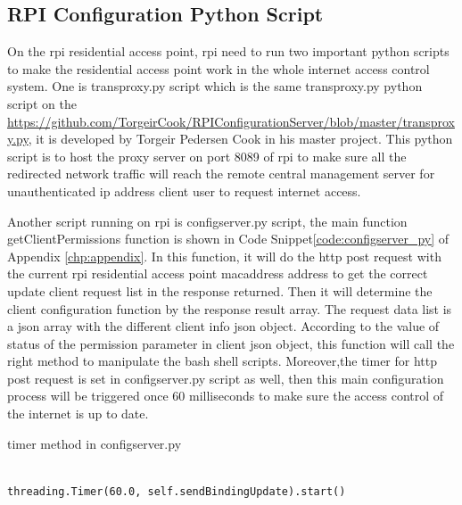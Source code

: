 \subsection{RPI Configuration Python Script}
\par On the \gls{rpi} residential access point, \gls{rpi} need to run two important python scripts to make the residential access point work in the whole internet access control system. One is transproxy.py script which is the same transproxy.py python script on the \url{https://github.com/TorgeirCook/RPIConfigurationServer/blob/master/transproxy.py}, it is developed by Torgeir Pedersen Cook in his master project. This python script is to host the proxy server on port 8089 of \gls{rpi} to make sure all the redirected network traffic will reach the remote central management server for unauthenticated \gls{ip} address client user to request internet access.
\par Another script running on \gls{rpi} is configserver.py script, the main function getClientPermissions function is shown in Code Snippet\ref{code:configserver_py} of Appendix \ref{chp:appendix}. In this function, it will do the \gls{http} post request with the current \gls{rpi} residential access point \gls{macaddress} address to get the correct update client request list in the response returned. Then it will determine the client configuration function by the response result array. The request data list is a \gls{json} array with the different client info \gls{json} object. According to the value of status of the permission parameter in client \gls{json} object, this function will call the right method to manipulate the bash shell scripts. Moreover,the timer for \gls{http} post request is set in configserver.py script as well, then this main configuration process will be triggered once 60 milliseconds to make sure the access control of the internet is up to date.
\begin{algorithm}[h]
  \caption{timer method in configserver.py}
  \label{code:timer_configserver}
  \begin{verbatim}
  
threading.Timer(60.0, self.sendBindingUpdate).start()
 \end{verbatim}
\end{algorithm}

